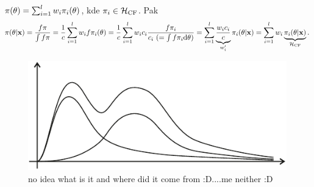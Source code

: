 \begin{remark}
	$\pi(\theta)=\sum_{i=1}^lw_i\pi_i(\theta)$, kde $\pi_i\in\mathcal{H}_\mathrm{CF}$. Pak $$\pi(\theta|\textbf{x})=\frac{f\pi}{\int f\pi}=\frac{1}{c}\sum_{i=1}^lw_i f\pi_i(\theta)=\frac{1}{c}\sum_{i=1}^l w_ic_i\frac{f \pi_i}{c_i~(=\int f\pi_i\mathrm{d}\theta)}=\sum_{i=1}^l \underbrace{\frac{w_ic_i}{c}}_{w_i'}\pi_i(\theta|\textbf{x})=\sum_{i=1}^l w_i\underbrace{\pi_i(\theta|\textbf{x})}_{\mathcal{H}_\mathrm{CF}}.$$
		\begin{figure}[h]
			\centering
			\includegraphics[width=0.7\linewidth]{pictures/8_1}
			\caption{no idea what is it and where did it come from :D....me neither :D}
			\label{fig:81}
		\end{figure}
		
\end{remark}

